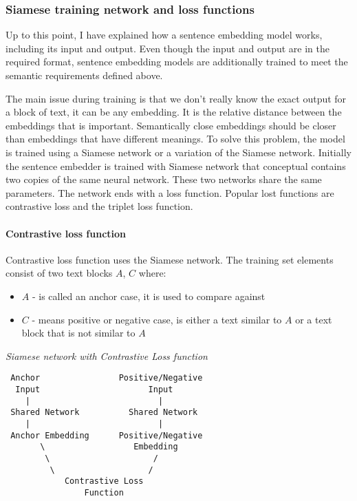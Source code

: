 \documentclass{wseas}
\begin{document}

\subsubsection{Siamese training network and loss
functions}\label{siamese-training-network-and-loss-functions}

Up to this point, I have explained how a sentence embedding model works,
including its input and output. Even though the input and output are in
the required format, sentence embedding models are additionally trained
to meet the semantic requirements defined above.

The main issue during training is that we don't really know the exact
output for a block of text, it can be any embedding. It is the relative
distance between the embeddings that is important. Semantically close
embeddings should be closer than embeddings that have different
meanings. To solve this problem, the model is trained using a Siamese
network or a variation of the Siamese network. Initially the sentence
embedder is trained with Siamese network that conceptual contains two
copies of the same neural network. These two networks share the same
parameters. The network ends with a loss function. Popular lost
functions are contrastive loss and the triplet loss function.

\paragraph{Contrastive loss function}\label{contrastive-loss-function}

Contrastive loss function uses the Siamese network. The training set
elements consist of two text blocks \(A\), \(C\) where:

\begin{itemize}
\item
  \(A\) - is called an anchor case, it is used to compare against
\item
  \(C\) - means positive or negative case, is either a text similar to
  \(A\) or a text block that is not similar to \(A\)
\end{itemize}

\emph{Siamese network with Contrastive Loss function}

\begin{verbatim}
 Anchor                Positive/Negative
  Input                      Input
    |                          |
 Shared Network          Shared Network 
    |                          |
 Anchor Embedding      Positive/Negative 
       \                  Embedding
        \                     /
         \                   /
            Contrastive Loss
                Function
\end{verbatim}
\end{document}
